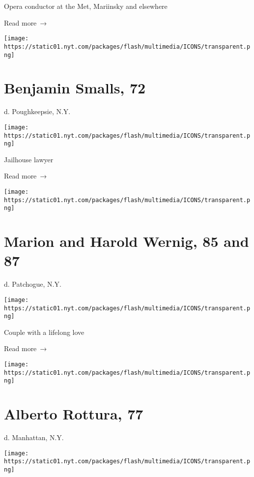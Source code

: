 Opera conductor at the Met, Mariinsky and elsewhere

 Read more~→

\href{https://www.nytimes.com/2020/05/31/obituaries/benjamin-smalls-dead.html}{}

\texttt{[image: https://static01.nyt.com/packages/flash/multimedia/ICONS/transparent.png]}

\hypertarget{benjamin-smalls-72}{%
\section{Benjamin Smalls, 72}\label{benjamin-smalls-72}}

d. Poughkeepsie, N.Y.

\texttt{[image: https://static01.nyt.com/packages/flash/multimedia/ICONS/transparent.png]}

Jailhouse lawyer

 Read more~→

\href{https://www.nytimes.com/2020/05/29/obituaries/harold-and-marion-wernig-dead-coronavirus.html}{}

\texttt{[image: https://static01.nyt.com/packages/flash/multimedia/ICONS/transparent.png]}

\hypertarget{marion-and-harold-wernig-85-and-87}{%
\section{Marion and Harold Wernig, 85 and
87}\label{marion-and-harold-wernig-85-and-87}}

d. Patchogue, N.Y.

\texttt{[image: https://static01.nyt.com/packages/flash/multimedia/ICONS/transparent.png]}

Couple with a lifelong love

 Read more~→

\href{https://www.nytimes.com/2020/05/29/obituaries/alberto-rottura-dead-coronavirus.html}{}

\texttt{[image: https://static01.nyt.com/packages/flash/multimedia/ICONS/transparent.png]}

\hypertarget{alberto-rottura-77}{%
\section{Alberto Rottura, 77}\label{alberto-rottura-77}}

d. Manhattan, N.Y.

\texttt{[image: https://static01.nyt.com/packages/flash/multimedia/ICONS/transparent.png]}

